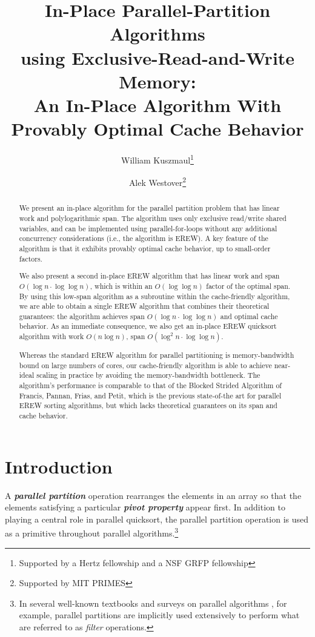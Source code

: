 \documentclass[twocolumn,10pt]{article}
\title{In-Place Parallel-Partition Algorithms \\ using Exclusive-Read-and-Write Memory:\\ An In-Place Algorithm With Provably Optimal Cache Behavior}
\date{\vspace{-5ex}}
\author[1]{\small William Kuszmaul\thanks{Supported by a Hertz fellowship and a NSF GRFP fellowship}}
\author[2]{\small Alek Westover\thanks{Supported by MIT PRIMES}}
\affil[1]{\footnotesize MIT}
\affil[2]{\footnotesize MIT PRIMES}
\affil[ ]{\textit{kuszmaul@mit.edu, alek.westover@gmail.com}}
\newcommand{\defn}[1]{{\textit{\textbf{\boldmath #1}}}\xspace}
\theoremstyle{remark}
\theoremstyle{remark}
\begin{document}
  \maketitle

  \begin{abstract}
We present an in-place algorithm for the parallel partition problem that has linear work and polylogarithmic span. The algorithm uses only exclusive read/write shared variables, and can be implemented using parallel-for-loops without any additional concurrency considerations (i.e., the algorithm is EREW). A key feature of the algorithm is that it exhibits provably optimal cache behavior, up to small-order factors.

We also present a second in-place EREW algorithm that has linear work and span $O(\log n \cdot \log \log n)$, which is within an $O(\log\log n)$ factor of the optimal span. By using this low-span algorithm as a subroutine within the cache-friendly algorithm, we are able to obtain a single EREW algorithm that combines their theoretical guarantees: the algorithm achieves span $O(\log n \cdot \log \log n)$ and optimal cache behavior. As an immediate consequence, we also get an in-place EREW quicksort algorithm with work $O(n \log n)$, span $O(\log^2 n \cdot \log \log n)$.

Whereas the standard EREW algorithm for parallel partitioning is memory-bandwidth bound on large numbers of cores, our cache-friendly algorithm is able to achieve near-ideal scaling in practice by avoiding the memory-bandwidth bottleneck. The algorithm's performance is comparable to that of the Blocked Strided Algorithm of Francis, Pannan, Frias, and Petit, which is the previous state-of-the art for parallel EREW sorting algorithms, but which lacks theoretical guarantees on its span and cache behavior.
  \end{abstract}

\section{Introduction}

A \defn{parallel partition} operation rearranges the elements in an
array so that the elements satisfying a particular \defn{pivot
  property} appear first. In addition to playing a central role in
parallel quicksort, the parallel partition operation is used as a
primitive throughout parallel algorithms.\footnote{In several
  well-known textbooks and surveys on parallel algorithms
  \cite{AcarBl16,Blelloch96}, for example, parallel partitions are
  implicitly used extensively to perform what are referred to as
  \emph{filter} operations.}
\end{document}
